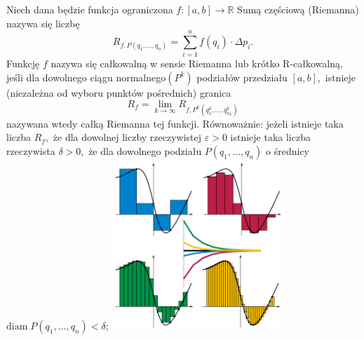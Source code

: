 \documentclass[a4paper,12pt,fleqn]{article}
\begin{document}






Niech dana będzie funkcja ograniczona
{$f\!\colon\! [a,b]\to \mathbb {R}$} Sumą częściową (Riemanna) nazywa się liczbę
\[{R_{f,P(q_{1},\dots ,q_{n})}=\sum _{i=1}^{n}f(q_{i})\cdot \Delta p_{i}.}\]
Funkcję {$f$} nazywa się całkowalną w sensie Riemanna lub krótko R-całkowalną, jeśli dla 
dowolnego ciągu normalnego{$(P^{k})$} podziałów przedziału {$ [a,b],$}  istnieje (niezależna od wyboru punktów pośrednich) granica
\[R_{f}=\lim _{{k\to \infty }}R_{{f,P^{k}\left(q_{1}^{k},\dots ,q_{{n_{k}}}^{k}\right)}}\]
nazywana wtedy całką Riemanna tej funkcji. Równoważnie: jeżeli istnieje taka liczba {$R_{f},$}  że dla dowolnej liczby rzeczywistej {$\varepsilon >0$} istnieje taka liczba rzeczywista {$\delta >0,$} że dla dowolnego podziału {$ P(q_{1},\dots ,q_{n})$}  o średnicy {$ \mathrm {diam} \;P(q_{1},\dots ,q_{n})<\delta ;$}
	\includegraphics[width=0.48\textwidth]{Riem.png}
\end{document}
